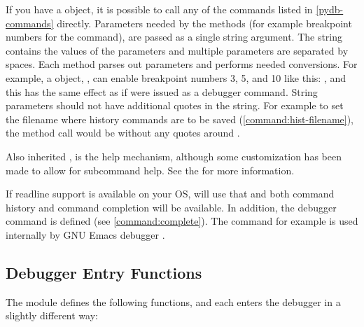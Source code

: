 If you have a  object, it is possible to call any of the
commands listed in \ref{pydb-commands} directly. Parameters needed by
the methods (for example breakpoint numbers for the 
command), are passed as a single string argument. The string contains
the values of the parameters and multiple parameters are separated by
spaces. Each method parses out parameters and performs needed
conversions.  For example, a  object, , can enable
breakpoint numbers 3, 5, and 10 like this: , and this has the same effect as if  were
issued as a debugger command. String parameters should not have
additional quotes in the string. For example to set the filename where
history commands are to be saved (\ref{command:hist-filename}), the
method call would be  without any quotes around .

Also inherited , is the help mechanism, although some
customization has been made to allow for subcommand help.  See the
for more information.

If readline support is available on your OS,  will use that
and both command history and command completion will be available. In
addition, the debugger  command is defined (see
\ref{command:complete}). The  command for example is
used internally by GNU Emacs debugger .

\subsection{Debugger Entry Functions}\label{entry-fns}

The  module defines the following functions, and each enters
the debugger in a slightly different way:

